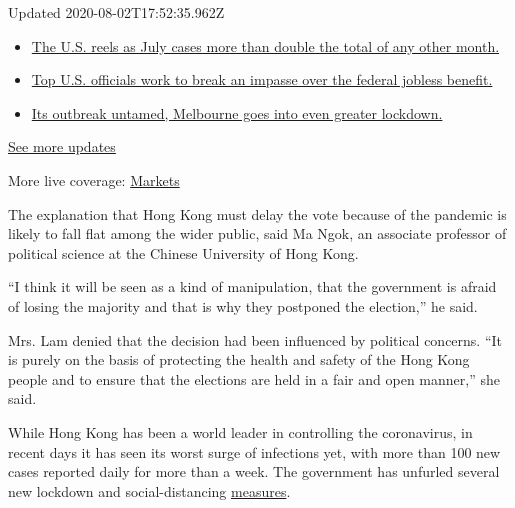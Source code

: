 Updated 2020-08-02T17:52:35.962Z

\begin{itemize}
\tightlist
\item
  \href{https://www.nytimes3xbfgragh.onion/2020/08/01/world/coronavirus-covid-19.html?action=click\&pgtype=Article\&state=default\&region=MAIN_CONTENT_1\&context=storylines_live_updates\#link-34047410}{The
  U.S. reels as July cases more than double the total of any other
  month.}
\item
  \href{https://www.nytimes3xbfgragh.onion/2020/08/01/world/coronavirus-covid-19.html?action=click\&pgtype=Article\&state=default\&region=MAIN_CONTENT_1\&context=storylines_live_updates\#link-780ec966}{Top
  U.S. officials work to break an impasse over the federal jobless
  benefit.}
\item
  \href{https://www.nytimes3xbfgragh.onion/2020/08/01/world/coronavirus-covid-19.html?action=click\&pgtype=Article\&state=default\&region=MAIN_CONTENT_1\&context=storylines_live_updates\#link-2bc8948}{Its
  outbreak untamed, Melbourne goes into even greater lockdown.}
\end{itemize}

\href{https://www.nytimes3xbfgragh.onion/2020/08/01/world/coronavirus-covid-19.html?action=click\&pgtype=Article\&state=default\&region=MAIN_CONTENT_1\&context=storylines_live_updates}{See
more updates}

More live coverage:
\href{https://www.nytimes3xbfgragh.onion/live/2020/07/31/business/stock-market-today-coronavirus?action=click\&pgtype=Article\&state=default\&region=MAIN_CONTENT_1\&context=storylines_live_updates}{Markets}

The explanation that Hong Kong must delay the vote because of the
pandemic is likely to fall flat among the wider public, said Ma Ngok, an
associate professor of political science at the Chinese University of
Hong Kong.

``I think it will be seen as a kind of manipulation, that the government
is afraid of losing the majority and that is why they postponed the
election,'' he said.

Mrs. Lam denied that the decision had been influenced by political
concerns. ``It is purely on the basis of protecting the health and
safety of the Hong Kong people and to ensure that the elections are held
in a fair and open manner,'' she said.

While Hong Kong has been a world leader in controlling the coronavirus,
in recent days it has seen its worst surge of infections yet, with more
than 100 new cases reported daily for more than a week. The government
has unfurled several new lockdown and social-distancing
\href{https://www.nytimes3xbfgragh.onion/2020/07/31/world/asia/hongkong-dining-lunch-coronavirus.html}{measures}.

